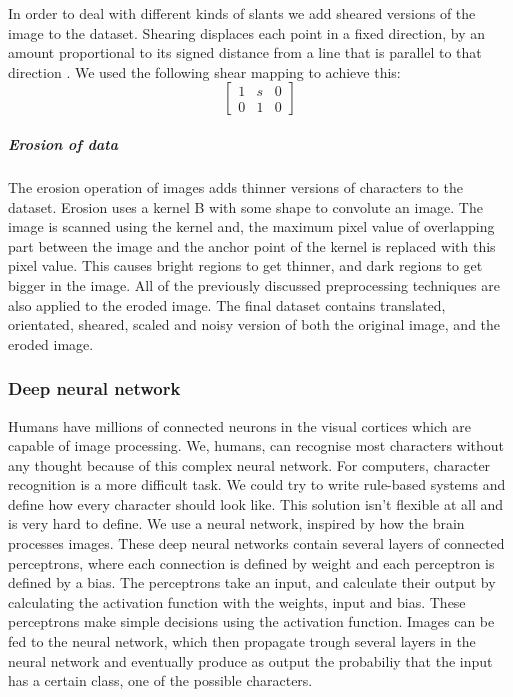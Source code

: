 \documentclass{article}
\begin{document}
In order to deal with different kinds of slants we add sheared versions of the image to the dataset. 
Shearing displaces each point in a fixed direction, by an amount proportional to its signed distance from a line that is parallel to that direction \cite{Shear}. We used the following shear mapping to achieve this: 
\begin{equation}
        \begin{bmatrix}
                1 & s & 0 \\
                0 & 1 & 0
        \end{bmatrix}
\end{equation}
\subparagraph{Erosion of data}
The erosion operation of images adds thinner versions of characters to the dataset. Erosion uses a kernel B with some shape to convolute an image. The image is scanned using the kernel and, the maximum pixel value of overlapping part between the image and the anchor point of the kernel is replaced with this pixel value. This causes bright regions to get thinner, and dark regions to get bigger in the image. 
All of the previously discussed preprocessing techniques are also applied to the eroded image. The final dataset contains translated, orientated, sheared, scaled and noisy version of both the original image, and the eroded image. 
\subsubsection{Deep neural network}
\label{sec:dnn}
Humans have millions of connected neurons in the visual cortices which are capable of image processing. We, humans, can recognise most characters without any thought because of this complex neural network. For computers, character recognition is a more difficult task. We could try to write rule-based systems and define how every character should look like. This solution isn't flexible at all and is very hard to define. We use a neural network, inspired by how the brain processes images. These deep neural networks contain several layers of connected perceptrons, where each connection is defined by weight and each perceptron is defined by a bias. The perceptrons take an input, and calculate their output by calculating the activation function with the weights, input and bias. These perceptrons make simple decisions using the activation function. Images can be fed to the neural network, which then propagate trough several layers in the neural network and eventually produce as output the probabiliy that the input has a certain class, one of the possible characters. 
\end{document}
